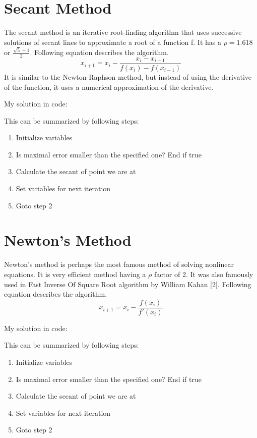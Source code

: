 \documentclass[11pt]{article}
\begin{document}
\newpage
\section{Secant Method}
The secant method is an iterative root-finding algorithm that uses
successive solutions of secant lines to approximate a root of a function f.
It has a $\rho=1.618$ or $\frac{\sqrt{5}+1}{2}$. 
Following equation describes the algorithm. 
$$x_{i+1} = x_i - \frac{x_i - x_{i-1}}{f(x_i)-f(x_{i-1})}$$
It is similar to the Newton-Raphson method, but instead of using the
derivative of the function, it uses a numerical approximation of the
derivative.

My solution in code:


This can be summarized by following steps:
\begin{enumerate}
    \setlength\itemsep{0em}
    \item Initialize variables
    \item Is maximal error smaller than the specified one? End if true
    \item Calculate the secant of point we are at
    \item Set variables for next iteration
    \item Goto step 2
\end{enumerate}

\newpage
\section{Newton's Method}
Newton's method is perhaps the most famous method of solving nonlinear equations.
It is very efficient method having a $\rho$ factor of 2.
It was also famously used in Fast Inverse Of Square Root algorithm by William Kahan [2].
Following equation describes the algorithm. 
$$x_{i+1} = x_i - \frac{f(x_i)}{f'(x_i)}$$

My solution in code:


This can be summarized by following steps:
\begin{enumerate}
    \setlength\itemsep{0em}
    \item Initialize variables
    \item Is maximal error smaller than the specified one? End if true
    \item Calculate the secant of point we are at
    \item Set variables for next iteration
    \item Goto step 2
\end{enumerate}
\end{document}
